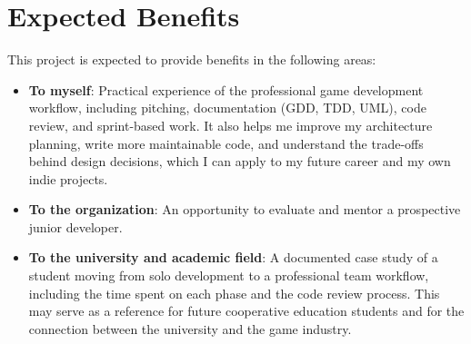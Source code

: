 \section{Expected Benefits}
This project is expected to provide benefits in the following areas:

\begin{itemize}[label=-]
    \item \textbf{To myself}: Practical experience of the professional game development workflow, including pitching, documentation (GDD, TDD, UML), code review, and sprint-based work. It also helps me improve my architecture planning, write more maintainable code, and understand the trade-offs behind design decisions, which I can apply to my future career and my own indie projects.
    \item \textbf{To the organization}: An opportunity to evaluate and mentor a prospective junior developer.
    \item \textbf{To the university and academic field}: A documented case study of a student moving from solo development to a professional team workflow, including the time spent on each phase and the code review process. This may serve as a reference for future cooperative education students and for the connection between the university and the game industry.
\end{itemize}